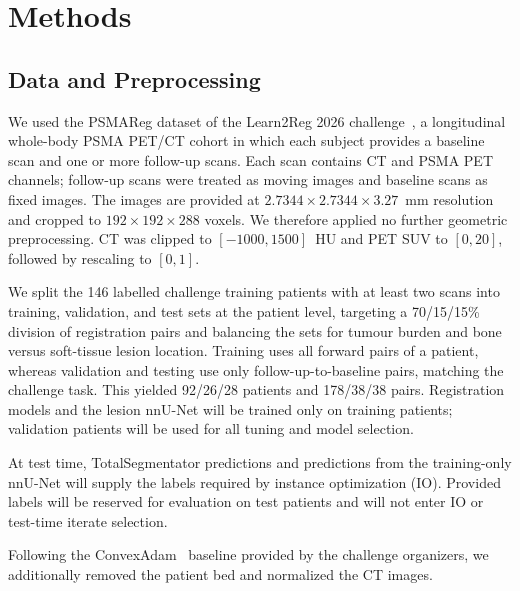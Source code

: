 \section{Methods}

\subsection{Data and Preprocessing}
\label{sec:data_and_preprocessing}

We used the PSMAReg dataset of the Learn2Reg 2026 challenge~\cite{ref_psmareg_challenge}, a longitudinal whole-body PSMA PET/CT cohort in which each subject provides a baseline scan and one or more follow-up scans.
Each scan contains CT and PSMA PET channels; follow-up scans were treated as moving images and baseline scans as fixed images.
The images are provided at $2.7344\times2.7344\times3.27$~mm resolution and cropped to $192\times192\times288$ voxels.
We therefore applied no further geometric preprocessing.
CT was clipped to $[-1000, 1500]$~HU and PET SUV to $[0, 20]$, followed by rescaling to $[0,1]$.

\begin{journaladdition}
We split the 146 labelled challenge training patients with at least two scans into training, validation, and test sets at the patient level, targeting a 70/15/15\% division of registration pairs and balancing the sets for tumour burden and bone versus soft-tissue lesion location.
Training uses all forward pairs of a patient, whereas validation and testing use only follow-up-to-baseline pairs, matching the challenge task.
This yielded 92/26/28 patients and 178/38/38 pairs.
Registration models and the lesion nnU-Net will be trained only on training patients; validation patients will be used for all tuning and model selection.

At test time, TotalSegmentator predictions and predictions from the training-only nnU-Net will supply the labels required by instance optimization (IO).
Provided labels will be reserved for evaluation on test patients and will not enter IO or test-time iterate selection.
\end{journaladdition}
Following the ConvexAdam~\cite{ref_convexadam} baseline provided by the challenge organizers, we additionally removed the patient bed and normalized the CT images.




